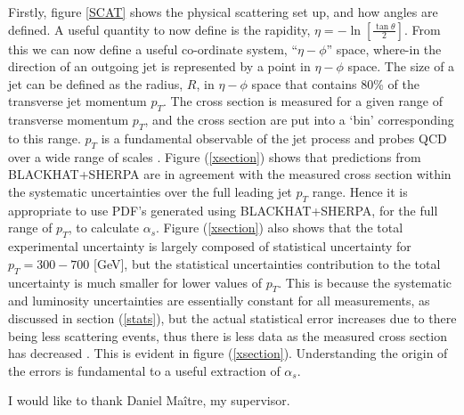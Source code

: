 \documentclass[12pt, onecolumn]{revtex4}    %
\begin{document}
Firstly, figure \ref{SCAT} shows the physical scattering set up, and how angles are defined. A useful quantity to now define is the rapidity, ${\eta = -\ln[\frac{\tan{\theta}}{2}]}$. From this we can now define a useful co-ordinate system, ``${\eta-\phi}$'' space, where-in the direction of an outgoing jet is represented by a point in ${\eta-\phi}$ space. The size of a jet can be defined as the radius, $R$, in ${\eta-\phi}$ space that contains 80\% of the transverse jet momentum ${p_T}$. The cross section is measured for a given range of transverse momentum ${p_T}$, and the cross section are put into a `bin' corresponding to this range. ${p_T}$ is a fundamental observable of the jet process and probes QCD over a wide range of scales \cite{HEPP}. Figure (\ref{xsection}) shows that predictions from BLACKHAT+SHERPA are in agreement with the measured cross section within the systematic uncertainties over the full leading jet ${p_T}$ range. Hence it is appropriate to use PDF's generated using BLACKHAT+SHERPA, for the full range of ${p_T}$, to calculate ${\alpha_s}$. Figure (\ref{xsection}) also shows that the total experimental uncertainty is largely composed of statistical uncertainty for ${p_T = 300-700}$ [GeV], but the statistical uncertainties contribution to the total uncertainty is much smaller for lower values of ${p_T}$. This is because the systematic and luminosity uncertainties are essentially constant for all measurements, as discussed in section (\ref{stats}), but the actual statistical error increases due to there being less scattering events, thus there is less data as the measured cross section has decreased \cite{HEPD}. This is evident in figure (\ref{xsection}). Understanding the origin of the errors is fundamental to a useful extraction of ${\alpha_s}$.
	


\begin{acknowledgments}
I would like to thank Daniel Ma\^itre, my supervisor. 
\end{acknowledgments}
\end{document}

